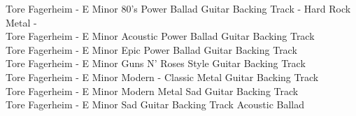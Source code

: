 Tore Fagerheim - E Minor 80's Power Ballad Guitar Backing Track - Hard Rock Metal -\\
Tore Fagerheim - E Minor Acoustic Power Ballad Guitar Backing Track\\
Tore Fagerheim - E Minor Epic Power Ballad Guitar Backing Track\\
Tore Fagerheim - E Minor Guns N' Roses Style Guitar Backing Track\\
Tore Fagerheim - E Minor Modern - Classic Metal Guitar Backing Track\\
Tore Fagerheim - E Minor Modern Metal Sad Guitar Backing Track\\
Tore Fagerheim - E Minor Sad Guitar Backing Track Acoustic Ballad\\

